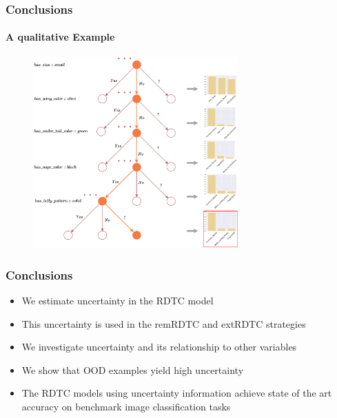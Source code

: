 \documentclass[9pt]{beamer}
\begin{document}
\begin{frame}
\frametitle{Conclusions}
\framesubtitle{A qualitative Example}
\begin{figure}
	\centering
	\includegraphics[width=0.7\textwidth]{images/example_tree.pdf}
\label{fig:example_tree}
\end{figure}
\end{frame} 







\begin{frame}
\frametitle{Conclusions}
\begin{itemize}
	\item We estimate uncertainty in the RDTC model
	\item This uncertainty is used in the remRDTC and extRDTC strategies
	\item We investigate uncertainty and its relationship to other variables
	\item We show that OOD examples yield high uncertainty
	\item The RDTC models using uncertainty information achieve state of the art accuracy on benchmark image classification tasks
\end{itemize}
\end{frame}




\begin{frame}
	
	
\end{frame}
\end{document}
